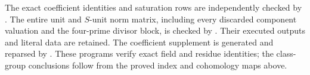 The exact coefficient identities and saturation rows are independently
checked by .
The entire unit and $S$-unit norm matrix, including every discarded
component valuation and the four-prime divisor block, is checked by
.
Their executed outputs and literal data are retained.
The coefficient supplement is generated and reparsed by
.
These programs verify exact field and residue identities; the class-group
conclusions follow from the proved index and cohomology maps above.


